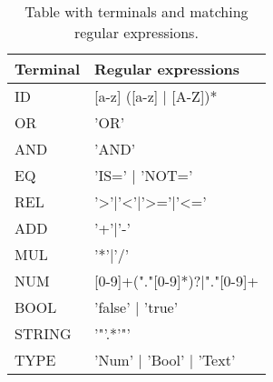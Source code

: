 \begin{table}[]
\centering
\label{fig:Lexicon}
\begin{tabular}{|l|l|}
\hline
Terminal & Regular expressions                \\ \hline
ID       & {[}a-z{]} ({[}a-z{]} | {[}A-Z{]})* \\ \hline
OR		 & 'OR'								  \\ \hline
AND		 & 'AND'							  \\ \hline
EQ		 & 'IS=' | 'NOT='					  \\ \hline
REL		 & '>'|'<'|'>='|'<='					  \\ \hline
ADD		 & '+'|'-'							  \\ \hline
MUL		 & '*'|'/'							  \\ \hline
NUM		 & [0-9]+("."[0-9]*)?|"."[0-9]+\\ \hline
BOOL 	 & 'false' | 'true'					  \\ \hline
STRING 	 & '"'.*'"'						      \\ \hline
TYPE     & 'Num' | 'Bool' | 'Text'            \\ \hline


\end{tabular}
\caption{Table with terminals and matching regular expressions.}
\end{table}
